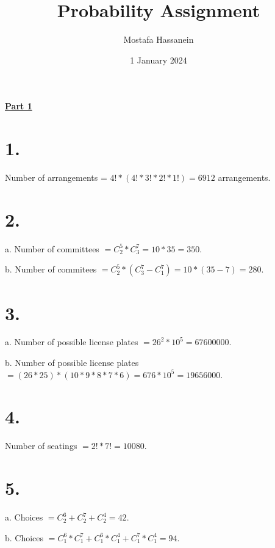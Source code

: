\documentclass{article}
\author{Mostafa Hassanein}
\title{Probability Assignment}
\date{1 January 2024}
\begin{document}
\maketitle

\newpage

\newcommand*\numcircledmod[1]{\raisebox{.5pt}{\textcircled{\raisebox{-.9pt} {#1}}}}

\newcommand*\numcircledtikz[1]{\tikz[baseline=(char.base)]{
            \node[shape=circle,draw,inner sep=1.2pt] (char) {#1};}} 

\begin{center}
  \textbf{\underline{Part 1}}
\end{center}

\section*{1.}

Number of arrangements = $4!*(4!*3!*2!*1!) = 6912$ arrangements.

\section*{2.}

a. Number of committees $= C^5_2 * C^7_3 = 10 * 35 = 350$.

\noindent
b. Number of commitees $= C^5_2 * (C^7_3 - C^7_1) = 10 * (35 - 7) = 280$.

\section*{3.}
a. Number of possible license plates $= 26^2*10^5 = 67600000$.

\noindent
b. Number of possible license plates $= (26*25)*(10*9*8*7*6) = 676 * 10^5 = 19656000$.

\section*{4.}

Number of seatings $= 2!*7! = 10080$.

\section*{5.}

a. Choices $= C^6_2 + C^7_2 + C^4_2 = 42$.

\noindent
b. Choices $= C^6_1 * C^7_1 + C^6_1 * C^4_1 + C^7_1 * C^4_1 = 94$.
\end{document}
